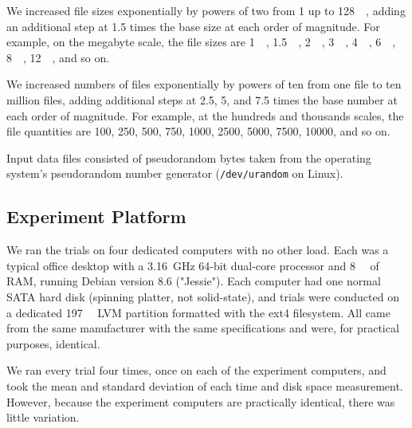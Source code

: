 We increased file sizes exponentially by powers of two from \SI{1}{\byte} up to \SI{128}{\gibi\byte}, adding an additional step at \num{1.5} times the base size at each order of magnitude.
For example, on the megabyte scale, the file sizes are \SI{1}{\mebi\byte}, \SI{1.5}{\mebi\byte}, \SI{2}{\mebi\byte}, \SI{3}{\mebi\byte}, \SI{4}{\mebi\byte}, \SI{6}{\mebi\byte}, \SI{8}{\mebi\byte}, \SI{12}{\mebi\byte}, and so on.

We increased numbers of files exponentially by powers of ten from one file to ten million files, adding additional steps at \num{2.5}, \num{5}, and \num{7.5} times the base number at each order of magnitude.
For example, at the hundreds and thousands scales, the file quantities are \num{100}, \num{250}, \num{500}, \num{750}, \num{1000}, \num{2500}, \num{5000}, \num{7500}, \num{10000}, and so on.

Input data files consisted of pseudorandom bytes taken from the operating system's pseudorandom number generator (\lstinline{/dev/urandom} on Linux).

%

\subsection{Experiment Platform}

We ran the trials on four dedicated computers with no other load.
Each was a typical office desktop with a \SI{3.16}{\giga\hertz} \num{64}-bit dual-core processor and \SI{8}{\gibi\byte} of RAM, running Debian version 8.6 ("Jessie").
Each computer had one normal SATA hard disk (spinning platter, not solid-state), and trials were conducted on a dedicated \SI{197}{\gibi\byte} LVM partition formatted with the ext4 filesystem.
All came from the same manufacturer with the same specifications and were, for practical purposes, identical.

We ran every trial four times, once on each of the experiment computers, and took the mean and standard deviation of each time and disk space measurement.
However, because the experiment computers are practically identical, there was little variation.

%
